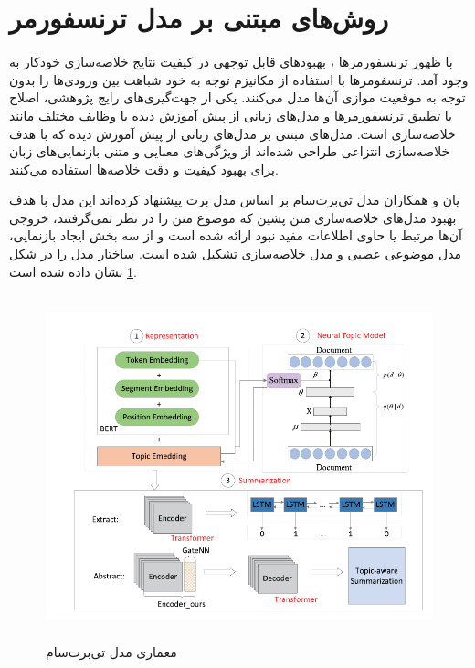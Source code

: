 \section{روش‌های مبتنی بر مدل ترنسفورمر‌}
با ظهور ترنسفورمرها
، بهبودهای قابل توجهی در کیفیت نتایج خلاصه‌سازی خودکار به وجود آمد. ترنسفومرها با استفاده از مکانیزم توجه به خود
شباهت بین ورودی‌ها را بدون توجه به موقعیت موازی آن‌ها مدل می‌کنند\cite{vaswani2017attention}. یکی از جهت‌گیری‌های رایج پژوهشی، اصلاح یا تطبیق ترنسفورمرها و مدل‌های زبانی از پیش آموزش دیده با وظایف مختلف مانند خلاصه‌سازی است. مدل‌های مبتنی بر مدل‌های زبانی از پیش آموزش دیده که با هدف خلاصه‌سازی انتزاعی طراحی شده‌اند از ویژگی‌های معنایی و متنی بازنمایی‌های زبان برای بهبود کیفیت و دقت خلاصه‌‌ها استفاده می‌کنند.



پان
و همکاران مدل  تی‌برت‌سام بر اساس مدل برت  پیشنهاد کرده‌اند
 این مدل  با هدف بهبود مدل‌های خلاصه‌سازی متن پشین که موضوع متن را در نظر نمی‌گرفتند، خروجی آن‌ها مرتبط یا حاوی اطلاعات مفید نبود ارائه شده است و از سه بخش ایجاد بازنمایی، مدل موضوعی عصبی
 و مدل خلاصه‌سازی تشکیل شده است. ساختار مدل را در شکل \ref{fig:tBert_model} نشان داده شده است.
\begin{figure}[!h]
	\begin{center}
		\includegraphics[height=10cm]{tbertsum_framework.png}
	\end{center}
	\caption{معماری مدل تی‌برت‌سام \cite{Ma2022TBERTSumTT}}
	\label{fig:tBert_model}
	\medskip
	\small
\end{figure}



